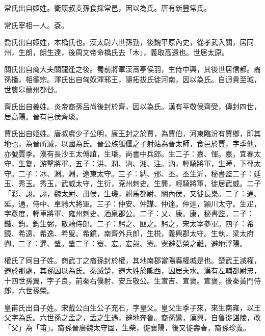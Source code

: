 
\begin{pinyinscope}

 常氏出自姬姓。衛康叔支孫食採常邑，因以為氏。唐有新豐常氏。



 常氏宰相一人。袞。



 喬氏出自姬姓，本橋氏也。漢太尉六世孫勤，後魏平原內史，從孝武入關，居同州，生朗，朗生達，後周文帝命橋氏去「木」，義取高遠也。世居太原。



 關氏出自商大夫關龍逢之後。蜀前將軍漢壽亭侯羽，生侍中興，其後世居信都。裔孫播，相德宗。渾氏出自匈奴渾邪王，隨拓拔氏徙河南，因以為氏。自迥貴至瑊，世襲皋蘭州都督。



 齊氏出自姜姓。炎帝裔孫呂尚後封於齊，因以為氏。漢有平敬侯齊受，傳封四世，居高陽。晉有邑侯齊琰。



 賈氏出自姬姓。唐叔虞少子公明，康王封之於賈，為賈伯，河東臨汾有賈鄉，即其地也，為晉所滅，以國為氏。晉公族狐偃之子射姑為晉太師，食邑於賈，字季他，亦號賈季。漢有長沙王太傅誼，生璠，尚書中兵郎。生二子：嘉、惲。嘉，宜春太守，生夐，游擊將軍。五子：洪、潤、汭、湘、注。汭，輕騎將軍，生曄，下邳太守。二子：冰、淵。淵，遼東太守。三子：納、邠、丕。丕生沂，秘書監二子：廷玉、秀玉。秀玉，武威太守，生衍，兗州刺史。生龔，輕騎將軍，徙居武威。二子「彩、詡。詡，魏太尉、肅侯，生璣，駙馬都尉、關內侯，又徙長樂。二子：通、延。通，侍中、車騎大將軍。三子：仲安、仲謀、仲達。仲達，潁川太守。生疋，字彥度，輕車將軍、雍州刺史、酒泉郡公。二子：乂、康。康，秘書監。二子：鍇、鈞。鈞生弼，散騎侍郎。二子：躬之、匪之。躬之，宋太宰參軍。四子：希鏡、希遠、希逸、希叟。希鏡，南齊外兵郎，生棁，義興郡太守。生執，梁太府卿。二子：暹、肇。肇二子：寰、宏。宏愨、憲。憲避葛榮之難，避地浮陽。



 權氏了同自子姓。商武丁之裔孫封於權，其地南郡當陽縣權城是也。楚武王滅權，遷於那處，其孫因以為氏。秦滅楚，遷大姓於隴西，因居天水。漢有左輔都尉忠，十四世孫翼，字子良，前秦右僕射、安丘敬公。生宣吉、宣褒。宣褒，後秦黃門侍郎，六世孫榮。



 皇甫氏出自子姓。宋戴公白生公子充石，字皇父。皇父生季子來，來生南雍，以王父字為氏。六世孫之孟之，孟之生遇，避地奔魯。裔孫鸞，漢興，自魯徙諶陵，改「父」為「甫」。裔孫晉廣魏太守固，生柴，徙襄陽，後又徙壽春，裔孫珍義。




\end{pinyinscope}
